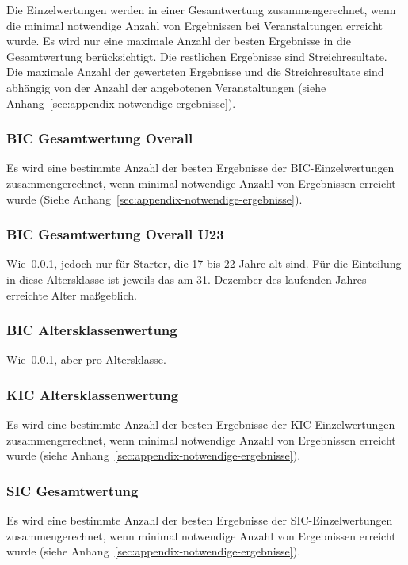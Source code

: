 Die Einzelwertungen werden in einer Gesamtwertung zusammengerechnet, wenn die minimal notwendige Anzahl von Ergebnissen bei Veranstaltungen erreicht wurde. Es wird nur eine maximale Anzahl der besten Ergebnisse in die Gesamtwertung berücksichtigt. Die restlichen Ergebnisse sind Streichresultate. Die maximale Anzahl der gewerteten Ergebnisse und die Streichresultate sind abhängig von der Anzahl der angebotenen Veranstaltungen (siehe Anhang~\ref{sec:appendix-notwendige-ergebnisse}).

\subsubsection{BIC Gesamtwertung Overall}
\label{subsec:bic-gesamtwertung-overall}
Es wird eine bestimmte Anzahl der besten Ergebnisse der BIC-Einzelwertungen zusammengerechnet, wenn minimal notwendige Anzahl von Ergebnissen erreicht wurde (Siehe Anhang~\ref{sec:appendix-notwendige-ergebnisse}).

\subsubsection{BIC Gesamtwertung Overall U23}
\label{subsec:bic-gesamtwertung-u23}
Wie~\ref{subsec:bic-gesamtwertung-overall}, jedoch nur für Starter, die 17 bis 22 Jahre alt sind. Für die Einteilung in diese Altersklasse ist jeweils das am 31. Dezember des laufenden Jahres erreichte Alter maßgeblich.

\subsubsection{BIC Altersklassenwertung}
\label{subsec:bic-ak-gesamtwertung}
Wie~\ref{subsec:bic-gesamtwertung-overall}, aber pro Altersklasse.

\subsubsection{KIC Altersklassenwertung}
\label{subsec:kic-gesamtwertung}
Es wird eine bestimmte Anzahl der besten Ergebnisse der KIC-Einzelwertungen zusammengerechnet, wenn minimal notwendige Anzahl von Ergebnissen erreicht wurde (siehe Anhang~\ref{sec:appendix-notwendige-ergebnisse}).

\subsubsection{SIC Gesamtwertung}
\label{subsec:sic-gesamtwertung}
Es wird eine bestimmte Anzahl der besten Ergebnisse der SIC-Einzelwertungen zusammengerechnet, wenn minimal notwendige Anzahl von Ergebnissen erreicht wurde (siehe Anhang~\ref{sec:appendix-notwendige-ergebnisse}).

